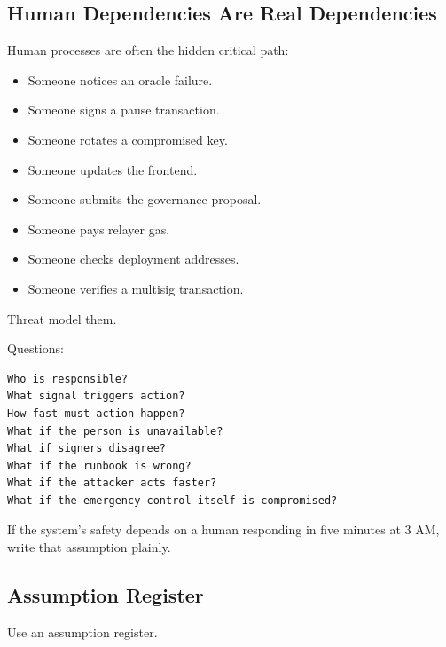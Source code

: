 \subsection{Human Dependencies Are Real Dependencies}

Human processes are often the hidden critical path:

\begin{itemize}
\tightlist
\item
  Someone notices an oracle failure.
\item
  Someone signs a pause transaction.
\item
  Someone rotates a compromised key.
\item
  Someone updates the frontend.
\item
  Someone submits the governance proposal.
\item
  Someone pays relayer gas.
\item
  Someone checks deployment addresses.
\item
  Someone verifies a multisig transaction.
\end{itemize}

Threat model them.

Questions:

\begin{lstlisting}
Who is responsible?
What signal triggers action?
How fast must action happen?
What if the person is unavailable?
What if signers disagree?
What if the runbook is wrong?
What if the attacker acts faster?
What if the emergency control itself is compromised?
\end{lstlisting}

If the system's safety depends on a human responding in five minutes at
3 AM, write that assumption plainly.

\subsection{Assumption Register}

Use an assumption register.

